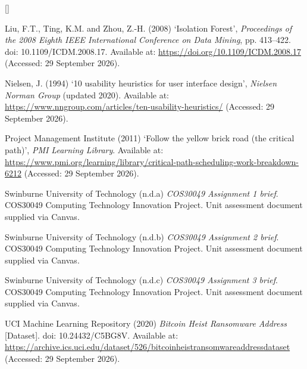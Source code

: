 \documentclass[a4paper,11pt]{article}
\newcounter{refnum}
\newenvironment{references}{%
  \sloppy\begin{list}{[\arabic{refnum}]}{\usecounter{refnum}\setlength{\labelwidth}{2.2em}%
    \setlength{\leftmargin}{2.8em}\setlength{\labelsep}{0.6em}%
    \setlength{\itemsep}{0.6\baselineskip}\setlength{\parsep}{0pt}}}%
  {\end{list}}
\begin{document}
\begin{references}
\item Liu, F.T., Ting, K.M. and Zhou, Z.-H. (2008) ‘Isolation Forest’, \textit{Proceedings of the 2008 Eighth IEEE International Conference on Data Mining}, pp. 413–422. doi: 10.1109/ICDM.2008.17. Available at: \url{https://doi.org/10.1109/ICDM.2008.17} (Accessed: 29 September 2026).

\item Nielsen, J. (1994) ‘10 usability heuristics for user interface design’, \textit{Nielsen Norman Group} (updated 2020). Available at: \url{https://www.nngroup.com/articles/ten-usability-heuristics/} (Accessed: 29 September 2026).

\item Project Management Institute (2011) ‘Follow the yellow brick road (the critical path)’, \textit{PMI Learning Library}. Available at: \url{https://www.pmi.org/learning/library/critical-path-scheduling-work-breakdown-6212} (Accessed: 29 September 2026).

\item Swinburne University of Technology (n.d.a) \textit{COS30049 Assignment 1 brief}. COS30049 Computing Technology Innovation Project. Unit assessment document supplied via Canvas.

\item Swinburne University of Technology (n.d.b) \textit{COS30049 Assignment 2 brief}. COS30049 Computing Technology Innovation Project. Unit assessment document supplied via Canvas.

\item Swinburne University of Technology (n.d.c) \textit{COS30049 Assignment 3 brief}. COS30049 Computing Technology Innovation Project. Unit assessment document supplied via Canvas.

\item UCI Machine Learning Repository (2020) \textit{Bitcoin Heist Ransomware Address} [Dataset]. doi: 10.24432/C5BG8V. Available at: \url{https://archive.ics.uci.edu/dataset/526/bitcoinheistransomwareaddressdataset} (Accessed: 29 September 2026).
\end{references}

\appendix


\end{document}
